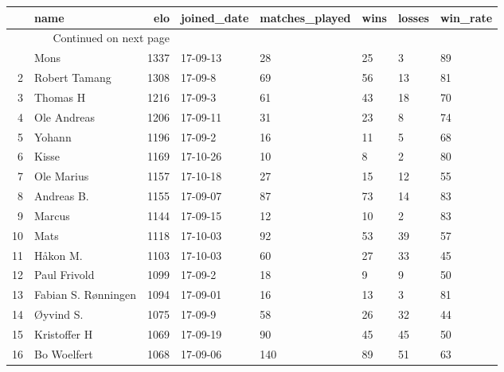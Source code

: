 \begin{longtable}{|r|l|r|l|l|l|l|l|}
\toprule
{} &                 name &   elo & joined\_date &  matches\_played &  wins &  losses &  win\_rate \\
\midrule
\endhead
\midrule
\multicolumn{3}{r}{{Continued on next page}} \\
\midrule
\endfoot

\bottomrule
\endlastfoot
1  &                 Mons &  1337 &    17-09-13 &              28 &    25 &       3 &        89 \\
2  &        Robert Tamang &  1308 &     17-09-8 &              69 &    56 &      13 &        81 \\
3  &             Thomas H &  1216 &     17-09-3 &              61 &    43 &      18 &        70 \\
4  &          Ole Andreas &  1206 &    17-09-11 &              31 &    23 &       8 &        74 \\
5  &               Yohann &  1196 &     17-09-2 &              16 &    11 &       5 &        68 \\
6  &                Kisse &  1169 &    17-10-26 &              10 &     8 &       2 &        80 \\
7  &           Ole Marius &  1157 &    17-10-18 &              27 &    15 &      12 &        55 \\
8  &           Andreas B. &  1155 &    17-09-07 &              87 &    73 &      14 &        83 \\
9  &               Marcus &  1144 &    17-09-15 &              12 &    10 &       2 &        83 \\
10 &                 Mats &  1118 &    17-10-03 &              92 &    53 &      39 &        57 \\
11 &             Håkon M. &  1103 &    17-10-03 &              60 &    27 &      33 &        45 \\
12 &         Paul Frivold &  1099 &     17-09-2 &              18 &     9 &       9 &        50 \\
13 &  Fabian S. Rønningen &  1094 &    17-09-01 &              16 &    13 &       3 &        81 \\
14 &            Øyvind S. &  1075 &     17-09-9 &              58 &    26 &      32 &        44 \\
15 &         Kristoffer H &  1069 &    17-09-19 &              90 &    45 &      45 &        50 \\
16 &          Bo Woelfert &  1068 &    17-09-06 &             140 &    89 &      51 &        63 \\

\end{longtable}
